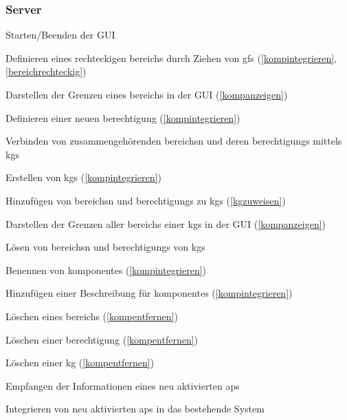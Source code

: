\subsubsection{Server}
\begin{sfalist}
	\item \label{faguioeffnenschliessen} Starten/Beenden der GUI
	\item \label{fabegrenzungziehen} Definieren eines rechteckigen \gls{bereich}s durch Ziehen von \glspl{gf} (\ref{kompintegrieren},\ref{bereichrechteckig})
	\item \label{faeinausblendenbereich} Darstellen der Grenzen eines \gls{bereich}s in der GUI (\ref{kompanzeigen})
	\item \label{faberechtigungdefinieren} Definieren einer neuen \gls{berechtigung} (\ref{kompintegrieren})
	\item \label{fakoppeln} Verbinden von zusammengehörenden \glspl{bereich}n und deren \glspl{berechtigung} mittels \glspl{kg}
	\begin{sfalist}
		\item \label{fakgerstellen} Erstellen von \glspl{kg} (\ref{kompintegrieren})
		\item \label{fahinzubereich} Hinzufügen von \glspl{bereich}n und \glspl{berechtigung} zu \glspl{kg} (\ref{kgzuweisen})
		\item \label{fabereichberechtigunganzeigen} Darstellen der Grenzen aller \glspl{bereich} einer \glspl{kg} in der GUI (\ref{kompanzeigen})
		\item \label{falösenkg}Lösen von \glspl{bereich}n und \glspl{berechtigung} von \glspl{kg}
	\end{sfalist}
	\item \label{fabereichbenennen} Benennen von \glspl{komponente} (\ref{kompintegrieren})
	\item \label{fakomponentebeschreiben} Hinzufügen einer Beschreibung für \glspl{komponente} (\ref{kompintegrieren})
	\item \label{faentfernenbereich} Löschen eines \gls{bereich}s (\ref{kompentfernen})
	\item \label{faberechtigunglöschen} Löschen einer \gls{berechtigung} (\ref{kompentfernen})
	\item \label{fakglöschen} Löschen einer \gls{kg} (\ref{kompentfernen})
	\item \label{fahinzufuegen} Empfangen der Informationen eines neu aktivierten \gls{ap}s
	\item \label{faapintegrieren} Integrieren von neu aktivierten \glspl{ap} in das bestehende System

\end{sfalist}
